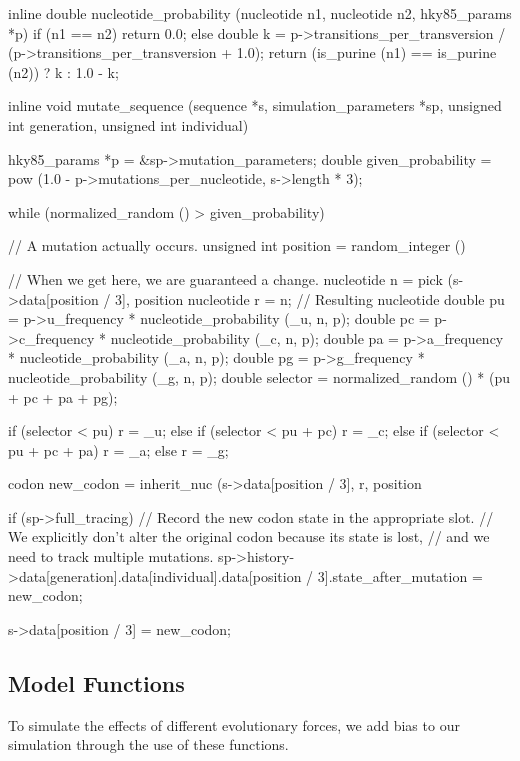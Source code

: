 \documentclass{article}
\begin{document}
\begin{ccode}
inline double nucleotide_probability (nucleotide n1, nucleotide n2, hky85_params *p) {
  if (n1 == n2)
    return 0.0;
  else {
    double k = p->transitions_per_transversion /
	       (p->transitions_per_transversion + 1.0);
    return (is_purine (n1) == is_purine (n2)) ? k : 1.0 - k;
  }
}

inline void mutate_sequence (sequence *s, simulation_parameters *sp,
			     unsigned int generation, unsigned int individual) {
  hky85_params *p = &sp->mutation_parameters;
  double given_probability = pow (1.0 - p->mutations_per_nucleotide, s->length * 3);

  while (normalized_random () > given_probability) {
    // A mutation actually occurs.
    unsigned int position = random_integer () %

    // When we get here, we are guaranteed a change.
    nucleotide n     = pick (s->data[position / 3], position %
    nucleotide r     = n; // Resulting nucleotide
    double pu        = p->u_frequency * nucleotide_probability (_u, n, p);
    double pc        = p->c_frequency * nucleotide_probability (_c, n, p);
    double pa        = p->a_frequency * nucleotide_probability (_a, n, p);
    double pg        = p->g_frequency * nucleotide_probability (_g, n, p);
    double selector  = normalized_random () * (pu + pc + pa + pg);

    if (selector < pu)        	 	r = _u;
    else if (selector < pu + pc)	r = _c;
    else if (selector < pu + pc + pa)	r = _a;
    else				r = _g;

    codon new_codon = inherit_nuc (s->data[position / 3], r, position %

    if (sp->full_tracing)
      // Record the new codon state in the appropriate slot.
      // We explicitly don’t alter the original codon because its state is lost,
      // and we need to track multiple mutations.
      sp->history->data[generation].data[individual].data[position / 3].state_after_mutation = new_codon;

    s->data[position / 3] = new_codon;
  }
}
\end{ccode}

    \subsection{Model Functions}

      To simulate the effects of different evolutionary forces, we add bias to
      our simulation through the use of these functions.
\end{document}
